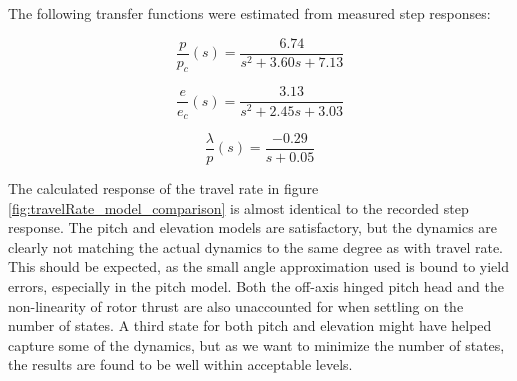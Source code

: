 The following transfer functions were estimated from measured step responses:

\begin{equation}
\label{eq:p_pc}
	\frac{p}{p_c}(s) = \frac{6.74}{s^2 + 3.60 s + 7.13}
\end{equation}

\begin{equation}
\label{eq:e_ec}
	\frac{e}{e_c}(s) = \frac{3.13}{s^2 + 2.45 s + 3.03}
\end{equation}

\begin{equation}
\label{eq:travelRate_p}
	\frac{\lambda}{p}(s) = \frac{-0.29}{s + 0.05}
\end{equation}


The calculated response of the travel rate in figure \ref{fig:travelRate_model_comparison} is almost identical to the recorded step response. The pitch and elevation models are satisfactory, but the dynamics are clearly not matching the actual dynamics to the same degree as with travel rate. This should be expected, as the small angle approximation used is bound to yield errors, especially in the pitch model. Both the off-axis hinged pitch head and the non-linearity of rotor thrust are also unaccounted for when settling on the number of states. A third state for both pitch and elevation might have helped capture some of the dynamics, but as we want to minimize the number of states, the results are found to be well within acceptable levels.



